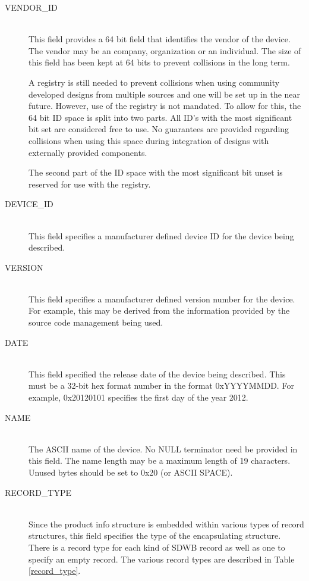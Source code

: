 \documentclass[a4paper, 12pt]{article}
\begin{document}
\begin{description}
\item[VENDOR\_ID] \hfill \\
This field provides a 64 bit field that identifies the vendor of the device. The vendor may
be an company, organization or an individual. The size of this field has been kept at 64
bits to prevent collisions in the long term.

A registry is still needed to prevent collisions when using community developed designs from
multiple sources and one will be set up in the near future. However, use of the registry is
not mandated. To allow for this, the 64 bit ID space is split into two parts. All ID's with
the most significant bit set are considered free to use. No guarantees are provided regarding
collisions when using this space during integration of designs with externally provided
components.

The second part of the ID space with the most significant bit unset is reserved for use with
the registry.

\item[DEVICE\_ID] \hfill \\
This field specifies a manufacturer defined device ID for the device being described.

\item[VERSION] \hfill \\
This field specifies a manufacturer defined version number for the device. For example, this
may be derived from the information provided by the source code management being used.

\item[DATE] \hfill \\
This field specified the release date of the device being described. This must be a 32-bit hex
format number in the format 0xYYYYMMDD. For example, 0x20120101 specifies the first day of the
year 2012.

\item[NAME] \hfill \\
The ASCII name of the device. No NULL terminator need be provided in this field. The name length
may be a maximum length of 19 characters. Unused bytes should be set to 0x20 (or ASCII SPACE).

\item[RECORD\_TYPE] \hfill \\
Since the product info structure is embedded within various types of record structures, this
field specifies the type of the encapsulating structure. There is a record type for each kind
of SDWB record as well as one to specify an empty record. The various record types are described
in Table \ref{record_type}.


\end{description}
\end{document}
